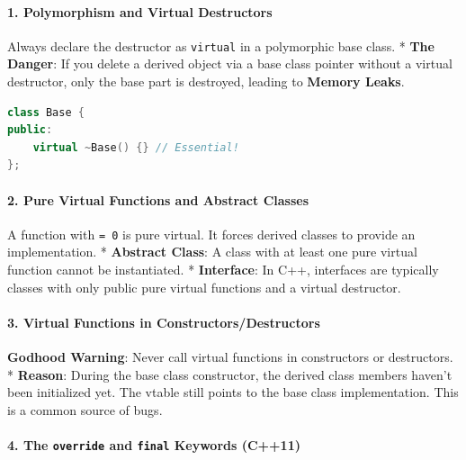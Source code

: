 \hypertarget{polymorphism-and-virtual-destructors}{%
\paragraph{1. Polymorphism and Virtual
Destructors}\label{polymorphism-and-virtual-destructors}}

Always declare the destructor as \passthrough{\lstinline!virtual!} in a
polymorphic base class. * \textbf{The Danger}: If you delete a derived
object via a base class pointer without a virtual destructor, only the
base part is destroyed, leading to \textbf{Memory Leaks}.

\begin{lstlisting}[language={C++}]
class Base {
public:
    virtual ~Base() {} // Essential!
};
\end{lstlisting}

\hypertarget{pure-virtual-functions-and-abstract-classes}{%
\paragraph{2. Pure Virtual Functions and Abstract
Classes}\label{pure-virtual-functions-and-abstract-classes}}

A function with \passthrough{\lstinline!= 0!} is pure virtual. It forces
derived classes to provide an implementation. * \textbf{Abstract Class}:
A class with at least one pure virtual function cannot be instantiated.
* \textbf{Interface}: In C++, interfaces are typically classes with only
public pure virtual functions and a virtual destructor.

\hypertarget{virtual-functions-in-constructorsdestructors}{%
\paragraph{3. Virtual Functions in
Constructors/Destructors}\label{virtual-functions-in-constructorsdestructors}}

\textbf{Godhood Warning}: Never call virtual functions in constructors
or destructors. * \textbf{Reason}: During the base class constructor,
the derived class members haven't been initialized yet. The vtable still
points to the base class implementation. This is a common source of
bugs.

\hypertarget{the-override-and-final-keywords-c11}{%
\paragraph{\texorpdfstring{4. The \texttt{override} and \texttt{final}
Keywords
(C++11)}{4. The override and final Keywords (C++11)}}\label{the-override-and-final-keywords-c11}}

